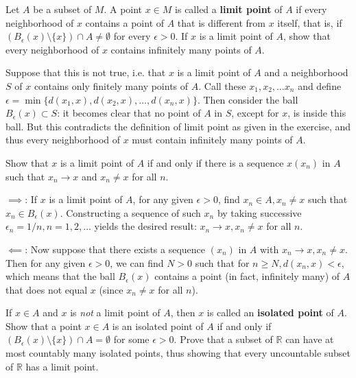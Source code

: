 \begin{exercise}{33}
    Let $A$ be a subset of $M$.
    A point $x \in M$ is called a \textbf{limit point} of $A$ if every neighborhood of $x$ contains a point of $A$ that is different from $x$ itself, that is, if $(B_{\epsilon}(x) \setminus \{x\}) \cap A \neq \emptyset$ for every $\epsilon > 0$.
    If $x$ is a limit point of $A$, show that every neighborhood of $x$ contains infinitely many points of $A$.
\end{exercise}

\begin{solution}
    
    Suppose that this is not true, i.e. that $x$ is a limit point of $A$ and a neighborhood $S$ of $x$ contains only finitely many points of $A$.
    Call these $x_1, x_2, \ldots x_n$ and define $\epsilon = \min\{d(x_1, x), d(x_2, x), \ldots, d(x_n, x)\}$.
    Then consider the ball $B_{\epsilon}(x) \subset S$: it becomes clear that no point of $A$ in $S$, except for $x$, is inside this ball.
    But this contradicts the definition of limit point as given in the exercise, and thus every neighborhood of $x$ must contain infinitely many points of $A$.
\end{solution}

\begin{exercise}{34}
    Show that $x$ is a limit point of $A$ if and only if there is a sequence $x(x_n)$ in $A$ such that $x_n \rightarrow x$ and $x_n \neq x$ for all $n$.
\end{exercise}

\begin{solution}
    
    $\implies$: If $x$ is a limit point of $A$, for any given $\epsilon > 0$, find $x_n \in A, x_n \neq x$ such that $x_n \in B_{\epsilon}(x)$.
    Constructing a sequence of such $x_n$ by taking successive $\epsilon_n = 1/n, n = 1, 2, \ldots$ yields the desired result: $x_n \rightarrow x, x_n \neq x$ for all $n$.

    $\impliedby$: Now suppose that there exists a sequence $(x_n)$ in $A$ with $x_n \rightarrow x, x_n \neq x$. 
    Then for any given $\epsilon > 0$, we can find $N > 0$ such that for $n \geq N, d(x_n, x) < \epsilon$, which means that the ball $B_{\epsilon}(x)$ contains a point (in fact, infinitely many) of $A$ that does not equal $x$ (since $x_n \neq x$ for all $n$).
\end{solution}

\begin{exercise}{40}
    If $x \in A$ and $x$ is \textit{not} a limit point of $A$, then $x$ is called an \textbf{isolated point} of $A$.
    Show that a point $x \in A$ is an isolated point of $A$ if and only if $(B_{\epsilon}(x) \setminus \{x\}) \cap A = \emptyset$ for some $\epsilon > 0$.
    Prove that a subset of $\mathbb{R}$ can have at most countably many isolated points, thus showing that every uncountable subset of $\mathbb{R}$ has a limit point.
\end{exercise}

